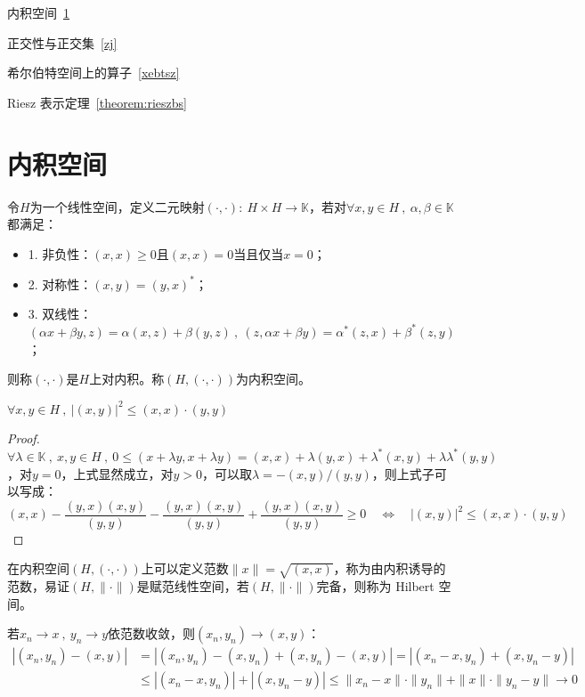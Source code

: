\begin{introduction}
    \item 内积空间~\ref{nj}
    \item 正交性与正交集~\ref{zj}
    \item 希尔伯特空间上的算子~\ref{xebtsz}
    \item Riesz 表示定理~\ref{theorem:rieszbs}
\end{introduction}
\section{内积空间}\label{nj}
\begin{definition}[内积和内积空间]
令$H$为一个线性空间，定义二元映射$(\cdot,\cdot): \ H \times H \to \mathbb{K}$，若对$\forall x,y \in H \ , \ \alpha,\beta \in \mathbb{K}$都满足：
\begin{itemize}
    \item 1. 非负性：$(x,x) \geq 0$且$(x,x)=0$当且仅当$x=0$；
    \item 2. 对称性：$(x,y)=(y,x)^*$；
    \item 3. 双线性：$(\alpha x + \beta y,z)=\alpha(x,z)+\beta(y,z) \ , \ (z,\alpha x + \beta y)=\alpha^*(z,x)+\beta^*(z,y)$；
\end{itemize}
则称$(\cdot,\cdot)$是$H$上对内积。称$(H,(\cdot,\cdot))$为内积空间。
\end{definition}
\begin{theorem}\label{theorem:Cauchy–Schwarz}
$\forall x,y \in H \ , \ |(x,y)|^2 \leq (x,x)\cdot(y,y)$
\end{theorem}
\begin{proof}
$\forall \lambda \in \mathbb{K} \ , \ x,y \in H \ , \ 0 \leq (x+\lambda y,x+\lambda y)=(x,x)+\lambda(y,x)+\lambda^*(x,y)+\lambda\lambda^*(y,y)$，对$y=0$，上式显然成立，对$y>0$，可以取$\lambda=-(x,y)/(y,y)$，则上式子可以写成：
\[(x,x)-\frac{(y,x)(x,y)}{(y,y)}-\frac{(y,x)(x,y)}{(y,y)}+\frac{(y,x)(x,y)}{(y,y)}\geq0 \quad \Leftrightarrow \quad |(x,y)|^2 \leq (x,x)\cdot(y,y)\]
\end{proof}

\begin{definition}[Hilbert 空间]
在内积空间$(H,(\cdot,\cdot))$上可以定义范数$\|x\|=\sqrt{(x,x)}$，称为由内积诱导的范数，易证$(H,\|\cdot\|)$是赋范线性空间，若$(H,\|\cdot\|)$完备，则称为 Hilbert 空间。
\end{definition}
\begin{proposition}[内积的连续性]
若$x_n \to x \ , \ y_n \to y$依范数收敛，则$(x_n,y_n) \to (x,y)$：
\[\begin{aligned}
|(x_n,y_n)-(x,y)|&=|(x_n,y_n)-(x,y_n)+(x,y_n)-(x,y)|=|(x_n-x,y_n)+(x,y_n-y)|\\
& \leq |(x_n-x,y_n)|+|(x,y_n-y)| \leq \|x_n-x\|\cdot\|y_n\| + \|x\|\cdot\|y_n-y\| \to 0
\end{aligned}\]
\end{proposition}

